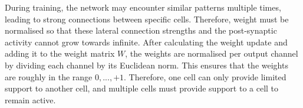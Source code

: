 During training, the network may encounter similar patterns multiple times, leading to strong connections between specific cells. Therefore, weight must be normalised so that these lateral connection strengths and the post-synaptic activity cannot grow towards infinite. After calculating the weight update and adding it to the weight matrix $W$, the weights are normalised per output channel by dividing each channel by its Euclidean norm. This ensures that the weights are roughly in the range $0, ..., +1$.
Therefore, one cell can only provide limited support to another cell, and multiple cells must provide support to a cell to remain active.






